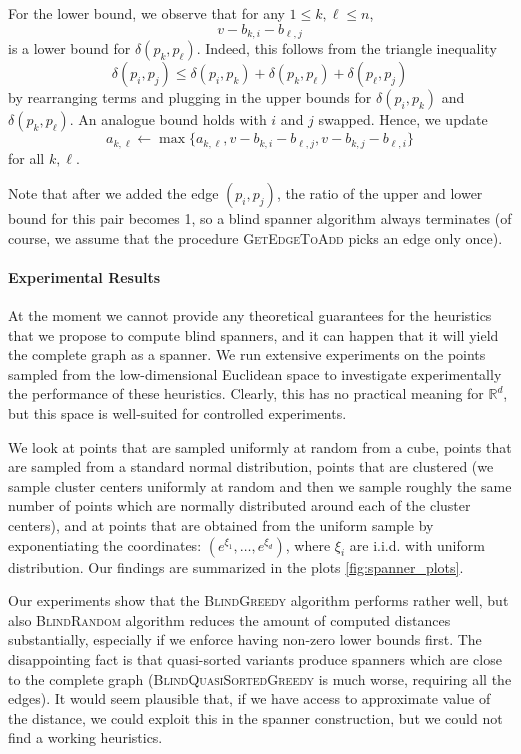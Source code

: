 \documentclass[a4paper,USenglish]{socg-lipics-v2018}
\newcommand{\R}{\mathbb{R}}
\newcommand{\dist}{\delta}
\begin{document}
For the lower bound, we observe that for any $1\leq k,\ell\leq n$,
\[
    v-b_{k,i}-b_{\ell,j}
\]
is a lower bound for $\dist(p_k,p_\ell)$. Indeed, this follows from
the triangle inequality
%
\[\dist(p_i,p_j)\leq \dist(p_i,p_k)+\dist(p_k,p_\ell)+\dist(p_\ell,p_j)\]
by rearranging terms and plugging in the upper bounds for $\dist(p_i,p_k)$
and $\dist(p_k,p_\ell)$. An analogue bound holds with $i$ and $j$ swapped. Hence, we update
%
\[a_{k,\ell}\gets \max\{a_{k,\ell},v-b_{k,i}-b_{\ell,j},v-b_{k,j}-b_{\ell,i}\}\]
%
for all $k,\ell$.

Note that after we added the edge $(p_i, p_j)$, the ratio of the upper and lower bound
for this pair becomes 1, so a blind spanner algorithm always terminates (of course,
we assume that the procedure \textsc{GetEdgeToAdd} picks an edge only once).


\paragraph{Experimental Results}
At the moment we cannot provide any theoretical guarantees for the heuristics that we propose to compute blind spanners,
and it can happen that it will yield the complete graph as a spanner.
We run extensive experiments on the points sampled from the low-dimensional Euclidean space to investigate
experimentally the performance of these heuristics. Clearly, this has no practical meaning for $\R^d$, but
this space is well-suited for controlled experiments.



We look at points that are sampled uniformly at random from a cube, points that are sampled
from a standard normal distribution, points that are clustered (we sample cluster centers uniformly at random
and then we sample roughly the same number of points which are normally distributed around each of the cluster
centers), and at points that are obtained from the uniform sample by exponentiating the coordinates:
$(e^{\xi_1}, \dots, e^{\xi_d})$, where $\xi_i$ are i.i.d. with uniform distribution.
Our findings are summarized in the plots \ref{fig:spanner_plots}.


Our experiments show that the \textsc{BlindGreedy} algorithm performs rather well, but also \textsc{BlindRandom}
algorithm reduces the amount of computed distances substantially, especially if we enforce having non-zero lower bounds
first. The disappointing fact is that quasi-sorted variants produce spanners which are close to the complete graph
(\textsc{BlindQuasiSortedGreedy} is much worse, requiring all the edges). It would seem plausible that, if we have
access to approximate value of the distance, we could exploit this in the spanner construction, but we could not
find a working heuristics.
\end{document}

